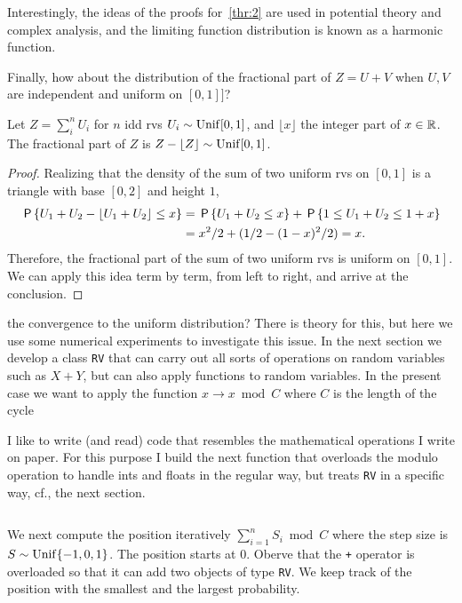 \documentclass[queueing-book.tex]{subfiles}
\begin{document}
Interestingly, the ideas of the proofs for~\cref{thr:2} are used in potential theory and complex analysis, and the limiting function distribution is known as a harmonic function.


Finally, how about the distribution of the fractional part of $Z=U+V$ when $U, V$ are independent and uniform on $[0,1]]$?

\begin{theorem}
Let $Z=\sum_{i}^{n} U_{i}$ for $n$ idd rvs $U_{i}\sim \Unif{[0,1]}$, and $\lfloor x \rfloor$  the integer part of $x\in \R$.
The fractional part of $Z$ is $Z-\lfloor Z \rfloor \sim \Unif{[0,1]}$.
\end{theorem}
\begin{proof}
Realizing that the density of the sum of two uniform rvs on $[0,1]$ is a triangle with base $[0,2]$ and height $1$,
\begin{align*}
\P{U_{1} +U_{2}- \lfloor U_{1}+U_{2} \rfloor \leq x} &= \P{U_{1} +U_{2}\leq x} + \P{1\leq U_{1} + U_{2}\leq 1 + x} \\
  &= x^{2}/2 +  (1/2 - (1-x)^{2} /2) = x.
\end{align*}
Therefore, the fractional part of the sum of two uniform rvs is uniform on $[0,1]$.
We can apply this idea term by term, from left to right, and arrive at the conclusion.
\end{proof}


 the convergence to the uniform distribution?
There is theory for this, but here we use some numerical experiments to investigate this issue.
In the next section we develop a class \texttt{RV} that can carry out all sorts of operations on random variables such as $X + Y$, but can also apply functions to random variables.
In the present case we want to apply the function $x \to x \bmod C$ where $C$ is the length of the cycle

I like to write (and read) code that resembles the mathematical operations I write on paper.
For this purpose I build the next function that overloads the modulo operation to handle ints and floats in the regular way, but treats \texttt{RV} in a specific way, cf., the next section.

\inputminted[firstline=8, lastline=18]{python}{../code/exp_convergence.py} %

We next compute the position iteratively $\sum_{i=1}^{n} S_{i} \bmod C$ where the step size is $S\sim\Unif{\{-1, 0, 1\}}$.
The position starts at $0$. Oberve that the \texttt{+} operator is overloaded so that it can add two objects of type \texttt{RV}. We keep track of the position with the smallest and the largest probability.
\end{document}
